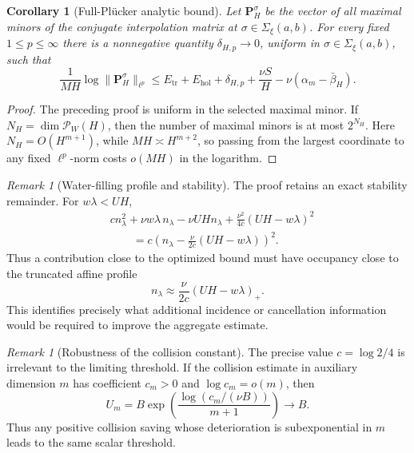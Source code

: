 \documentclass[11pt]{article}
\newcommand{\Comp}{\Sigma_{\xi}(a,b)}
\newtheorem{corollary}[theorem]{Corollary}
\theoremstyle{definition}
\theoremstyle{remark}
\newtheorem{remark}[theorem]{Remark}
\numberwithin{equation}{section}
\begin{document}
\begin{corollary}[Full-Pl\"ucker analytic bound]\label{cor:plucker-analytic}
Let $\mathbf P_H^\sigma$ be the vector of all maximal minors of the
conjugate interpolation matrix at $\sigma\in\Comp$.  For every fixed
$1\le p\le\infty$ there is a nonnegative quantity
$\delta_{H,p}\to0$, uniform in $\sigma\in\Comp$, such that
\begin{equation}\label{eq:plucker-bound}
 \frac1{MH}\log\|\mathbf P_H^\sigma\|_{\ell^p}
 \le
 E_{\mathrm{tr}}+E_{\mathrm{hol}}+\delta_{H,p}
 +\frac{\nu S}{H}
 -\nu(\alpha_m-\bar\beta_H).
\end{equation}
\end{corollary}

\begin{proof}
The preceding proof is uniform in the selected maximal minor.  If
$N_H=\dim\mathcal P_W(H)$, then the number of maximal minors is at most
$2^{N_H}$.  Here $N_H=O(H^{m+1})$, while $MH\asymp H^{m+2}$, so passing
from the largest coordinate to any fixed $\ell^p$-norm costs
$o(MH)$ in the logarithm.
\end{proof}

\begin{remark}[Water-filling profile and stability]\label{rem:water-filling}
The proof retains an exact stability remainder.  For $w\lambda<UH$,
\begin{align*}
 &cn_\lambda^2+\nu w\lambda\,n_\lambda-\nu UHn_\lambda
 +\frac{\nu^2}{4c}(UH-w\lambda)^2\\
 &\qquad=
 c\left(n_\lambda-\frac{\nu}{2c}(UH-w\lambda)\right)^2.
\end{align*}
Thus a contribution close to the optimized bound must have occupancy
close to the truncated affine profile
\[
 n_\lambda\approx\frac{\nu}{2c}(UH-w\lambda)_+.
\]
This identifies precisely what additional incidence or cancellation
information would be required to improve the aggregate estimate.
\end{remark}

\begin{remark}[Robustness of the collision constant]
The precise value $c=\log2/4$ is irrelevant to the limiting threshold.
If the collision estimate in auxiliary dimension $m$ has coefficient
$c_m>0$ and $\log c_m=o(m)$, then
\[
 U_m=B\exp\left(\frac{\log(c_m/(\nu B))}{m+1}\right)
 \longrightarrow B.
\]
Thus any positive collision saving whose deterioration is subexponential
in $m$ leads to the same scalar threshold.
\end{remark}
\end{document}
